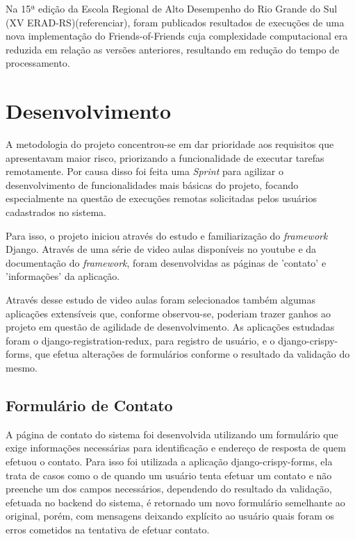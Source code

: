 \documentclass[tg]{mdtufsm}
\begin{document}
Na 15ª edição da Escola Regional de Alto Desempenho do Rio Grande do Sul (XV ERAD-RS)(referenciar), foram publicados resultados de execuções de uma nova implementação do Friends-of-Friends\cite{friends} cuja complexidade computacional era reduzida em relação as versões anteriores, resultando em redução do tempo de processamento.



\chapter{Desenvolvimento}
A metodologia do projeto concentrou-se em dar prioridade aos requisitos que apresentavam maior risco, priorizando a funcionalidade de executar tarefas remotamente. Por causa disso foi feita uma \emph{Sprint} para agilizar o desenvolvimento de funcionalidades mais básicas do projeto, focando especialmente na questão de execuções remotas solicitadas pelos usuários cadastrados no sistema.

Para isso, o projeto iniciou através do estudo e familiarização do \emph{framework} Django. Através de uma série de video aulas disponíveis no youtube e da documentação do \emph{framework}, foram desenvolvidas as páginas de 'contato' e 'informações' da aplicação.

Através desse estudo de video aulas foram selecionados também algumas aplicações extensíveis que, conforme observou-se, poderiam trazer ganhos ao projeto em questão de agilidade de desenvolvimento. As aplicações estudadas foram o django-registration-redux, para registro de usuário, e o django-crispy-forms, que efetua alterações de formulários conforme o resultado da validação do mesmo.


\section{Formulário de Contato}
A página de contato do sistema foi desenvolvida utilizando um formulário que exige informações necessárias para identificação e endereço de resposta de quem efetuou o contato. Para isso foi utilizada a aplicação django-crispy-forms, ela trata de casos como o de quando um usuário tenta efetuar um contato e não preenche um dos campos necessários, dependendo do resultado da validação, efetuada no backend do sistema, é retornado um novo formulário semelhante ao original, porém, com mensagens deixando explícito ao usuário quais foram os erros cometidos na tentativa de efetuar contato.
\end{document}
